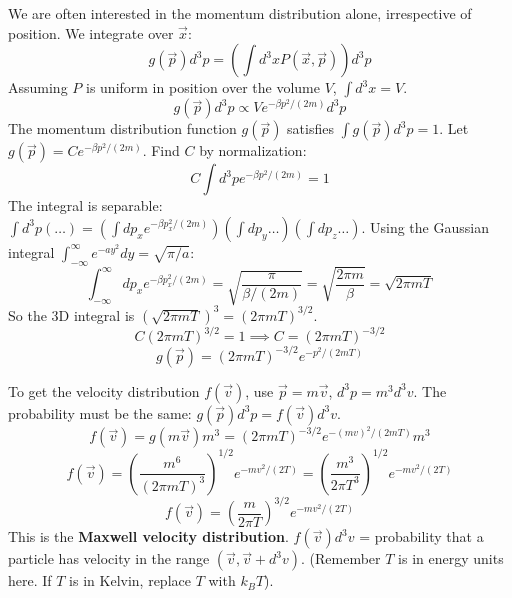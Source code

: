 \documentclass[11pt]{article}
\newcommand{\kb}{k_B} %
\begin{document}
We are often interested in the momentum distribution alone, irrespective of position. We integrate over $\vec{x}$:
\[ g(\vec{p}) d^3p = \left( \int d^3x P(\vec{x}, \vec{p}) \right) d^3p \]
Assuming $P$ is uniform in position over the volume $V$, $\int d^3x = V$.
\[ g(\vec{p}) d^3p \propto V e^{-\beta p^2 / (2m)} d^3p \]
The momentum distribution function $g(\vec{p})$ satisfies $\int g(\vec{p}) d^3p = 1$.
Let $g(\vec{p}) = C e^{-\beta p^2 / (2m)}$. Find $C$ by normalization:
\[ C \int d^3p e^{-\beta p^2 / (2m)} = 1 \]
The integral is separable: $\int d^3p (\dots) = (\int dp_x e^{-\beta p_x^2/(2m)}) (\int dp_y \dots) (\int dp_z \dots)$.
Using the Gaussian integral $\int_{-\infty}^{\infty} e^{-ay^2} dy = \sqrt{\pi/a}$:
\[ \int_{-\infty}^{\infty} dp_x e^{-\beta p_x^2/(2m)} = \sqrt{\frac{\pi}{\beta/(2m)}} = \sqrt{\frac{2\pi m}{\beta}} = \sqrt{2\pi m T} \]
So the 3D integral is $(\sqrt{2\pi m T})^3 = (2\pi m T)^{3/2}$.
\[ C (2\pi m T)^{3/2} = 1 \implies C = (2\pi m T)^{-3/2} \]
\[ g(\vec{p}) = (2\pi m T)^{-3/2} e^{-p^2 / (2mT)} \]

To get the velocity distribution $f(\vec{v})$, use $\vec{p} = m\vec{v}$, $d^3p = m^3 d^3v$.
The probability must be the same: $g(\vec{p}) d^3p = f(\vec{v}) d^3v$.
\[ f(\vec{v}) = g(m\vec{v}) m^3 = (2\pi m T)^{-3/2} e^{-(m v)^2 / (2mT)} m^3 \]
\[ f(\vec{v}) = \left( \frac{m^6}{(2\pi m T)^3} \right)^{1/2} e^{-m v^2 / (2T)} = \left( \frac{m^3}{2\pi T^3} \right)^{1/2} e^{-m v^2 / (2T)} \]
\[ f(\vec{v}) = \left( \frac{m}{2\pi T} \right)^{3/2} e^{-m v^2 / (2T)} \]
This is the \textbf{Maxwell velocity distribution}.
$f(\vec{v}) d^3v$ = probability that a particle has velocity in the range $(\vec{v}, \vec{v}+d^3v)$.
(Remember $T$ is in energy units here. If $T$ is in Kelvin, replace $T$ with $\kb T$).
\end{document}
